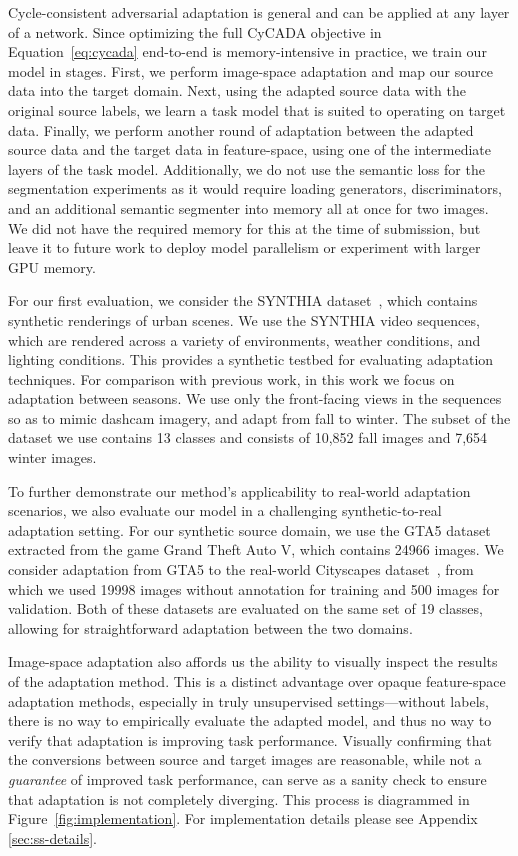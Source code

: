 Cycle-consistent adversarial adaptation is general and can be applied at any layer of a network. 
Since optimizing the full CyCADA objective in Equation~\ref{eq:cycada} end-to-end is memory-intensive in practice, we train our model in stages.
First, we perform image-space adaptation and map our source data into the target domain.
Next, using the adapted source data with the original source labels, we learn a task model that is suited to operating on target data.
Finally, we perform another round of adaptation between the adapted source data and the target data in feature-space, using one of the intermediate layers of the task model. Additionally, we do not use the semantic loss for the segmentation experiments as it would require loading generators, discriminators, and an additional semantic segmenter into memory all at once for two images. We did not have the required memory for this at the time of submission, but leave it to future work to deploy model parallelism or experiment with larger GPU memory. 


For our first evaluation, 
we consider the SYNTHIA dataset~\citep{ros_cvpr16}, which contains synthetic renderings of urban scenes.
We use the SYNTHIA video sequences, which are rendered across a variety of environments, weather conditions, and lighting conditions.
This provides a synthetic testbed for evaluating adaptation techniques.
For comparison with previous work, in this work we focus on adaptation between seasons.
We use only the front-facing views in the sequences so as to mimic dashcam imagery, and adapt from fall to winter.
The subset of the dataset we use contains 13 classes and consists of 10,852 fall images and 7,654 winter images.

To further demonstrate our method's applicability to real-world adaptation scenarios, we also evaluate our model in a challenging synthetic-to-real adaptation setting.
For our synthetic source domain, we use the GTA5 dataset~\citep{richter_eccv16} extracted from the game Grand Theft Auto V, which contains 24966 images. 
We consider adaptation from GTA5 to the real-world Cityscapes dataset~\citep{cordts_cvpr16}, from which we used 19998 images without annotation for training and 500 images for validation. 
Both of these datasets are evaluated on the same set of 19 classes, allowing for straightforward adaptation between the two domains.

Image-space adaptation also affords us the ability to visually inspect the results of the adaptation method.
This is a distinct advantage over opaque feature-space adaptation methods, especially in truly unsupervised settings---without labels, there is no way to empirically evaluate the adapted model, and thus no way to verify that adaptation is improving task performance.
Visually confirming that the conversions between source and target images are reasonable, while not a \emph{guarantee} of improved task performance, can serve as a sanity check to ensure that adaptation is not completely diverging. This process is diagrammed in Figure~\ref{fig:implementation}. For implementation details please see Appendix \ref{sec:ss-details}.





